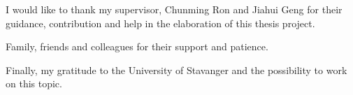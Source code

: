 
\acknowledgements

I would like to thank my supervisor, Chunming Ron and Jiahui Geng  for their guidance, contribution and help in the elaboration of this thesis project.

Family, friends and colleagues for their support and patience.

Finally, my gratitude to the University of Stavanger and the possibility to work on this topic.




